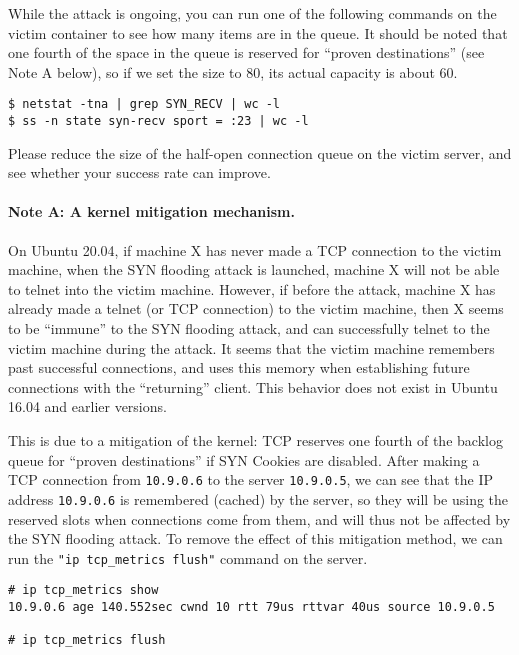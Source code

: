 \begin{itemize}
    While the attack is ongoing, you can run one of the following commands 
    on the victim container to see
    how many items are in the queue. It should be noted that one fourth of the 
    space in the queue is reserved for ``proven destinations'' (see Note A below), 
    so if we set the size to 80, its actual capacity is about 60. 

\begin{lstlisting}
$ netstat -tna | grep SYN_RECV | wc -l
$ ss -n state syn-recv sport = :23 | wc -l
\end{lstlisting}

    Please reduce the size of the half-open connection queue on the 
    victim server, and see whether your success rate can improve. 
\end{itemize}


\paragraph{Note A: A kernel mitigation mechanism.} On Ubuntu 20.04, if machine X
has never made a TCP connection to the victim machine, when the SYN flooding 
attack is launched, machine X will not be able to telnet into the 
victim machine. However, if before the attack, machine X
has already made a telnet (or TCP connection) to the victim machine, then X 
seems to be ``immune'' to the SYN flooding attack, and can
successfully telnet to the victim machine during the attack. 
It seems that the victim machine remembers past successful 
connections, and uses this memory when establishing
future connections with the ``returning'' client. 
This behavior does not exist in Ubuntu 16.04 and earlier versions.

This is due to a mitigation of the kernel: 
TCP reserves one fourth of the backlog queue for ``proven destinations'' 
if SYN Cookies are disabled. After making a TCP connection
from \texttt{10.9.0.6} to the server \texttt{10.9.0.5}, we can 
see that the IP address \texttt{10.9.0.6} is remembered (cached)
by the server, so they will be using the reserved slots
when connections come from them, and will thus not be 
affected by the SYN flooding attack.
To remove the effect of this mitigation method, we can 
run the \texttt{"ip tcp\_metrics flush"} command on
the server. 

\begin{lstlisting}
# ip tcp_metrics show
10.9.0.6 age 140.552sec cwnd 10 rtt 79us rttvar 40us source 10.9.0.5

# ip tcp_metrics flush
\end{lstlisting}


